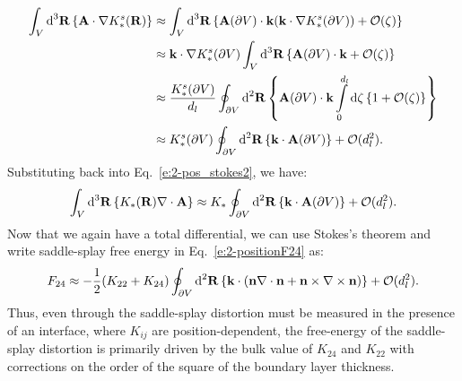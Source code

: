 \begin{align}
  \int_{V} \textup{d}^3\mathbf{R} \left \{ \mathbf{A} \cdot \nabla K_{*}^s (\mathbf{R}) \right \} & \approx
  \int_{V} \textup{d}^3\mathbf{R} \left \{\mathbf{A}(\partial V) \cdot \mathbf{k}(\mathbf{k} \cdot \nabla K_*^s(\partial V))  + \mathcal{O}(\zeta) \right \} \\ & \approx
  \mathbf{k} \cdot \nabla K_*^s(\partial V) \int_{V} \textup{d}^3\mathbf{R}\left \{\mathbf{A}(\partial V) \cdot \mathbf{k} + \mathcal{O}(\zeta) \right \} \\ & \approx
  \frac{K_*^s(\partial V)}{d_l} \oint_{\partial V} \textup{d}^2\mathbf{R}\left \{\mathbf{A}(\partial V) \cdot \mathbf{k} \int\limits_{0}^{d_l} \textup{d}\zeta \left \{ 1 + \mathcal{O}(\zeta) \right \}\right \} \\ & \approx
  K_*^s(\partial V) \oint_{\partial V} \textup{d}^2\mathbf{R}\left \{ \mathbf{k}  \cdot \mathbf{A}(\partial V) \right \} + \mathcal{O}(d_l^2).
\end{align}
Substituting back into Eq.~\ref{e:2-pos_stokes2}, we have:
\begin{equation}
  \int_{V}\textup{d}^3\mathbf{R} \left \{ K_{*} (\mathbf{R}) \nabla \cdot \mathbf{A} \right \} \approx
  K_* \oint_{\partial V} \textup{d}^2\mathbf{R} \left \{ \mathbf{k} \cdot \mathbf{A}(\partial V)\right \} + \mathcal{O}(d_l^2).\label{e:2-positionF24}
\end{equation}
Now that we again have a total differential, we can use Stokes's theorem and write saddle-splay free energy in Eq.~\ref{e:2-positionF24} as:
\begin{equation}
  F_{24} \approx -\frac{1}{2}(K_{22} + K_{24})
  \oint_{\partial V}\textup{d}^2 \mathbf{R} \left \{\mathbf{k} \cdot (\mathbf{n} \nabla \cdot \mathbf{n} + \mathbf{n} \times \nabla \times \mathbf{n}) \right \} + \mathcal{O}(d_l^2). \label{e:2-positionF24_surf}
\end{equation}
Thus, even through the saddle-splay distortion must be measured in the presence of an interface, where $K_{ij}$ are position-dependent, the free-energy of the saddle-splay distortion is primarily driven by the bulk value of $K_{24}$ and $K_{22}$ with corrections on the order of the square of the boundary layer thickness.\\

